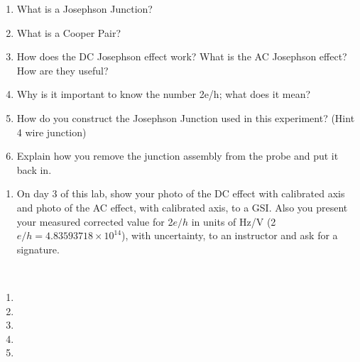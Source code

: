 \documentclass{../signatures}
\begin{document}
\maketitle

\names

\prelab

\begin{enumerate}

    \item What is a Josephson Junction?
    
    \item What is a Cooper Pair?

    \item How does the DC Josephson effect work? What is the AC Josephson effect? How are they useful?

    \item Why is it important to know the number 2e/h; what does it mean?

    \item How do you construct the Josephson Junction used in this experiment? (Hint 4 wire junction)

    \item Explain how you remove the junction assembly from the probe and put it back in.
    \\[36pt]
\end{enumerate}

\prelabsignatures

\midlab

\begin{enumerate}

    \item On day 3 of this lab, show your photo of the DC effect with calibrated axis and photo of the AC effect, with calibrated axis, to a GSI. Also you present your measured corrected value for 2$e/h$ in units of Hz/V (2$e/h= 4.83593718 \times 10^{14}$), with uncertainty, to an instructor and ask for a signature.
\\[36pt]
\end{enumerate}
\newpage
\checkpointsection 
\\[12pt]
\begin{enumerate}

\item {}

\item {}

\item {}

\item {}

\item {}

\end{enumerate}
\end{document}
